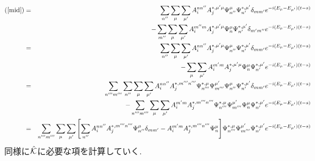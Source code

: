 \documentclass[10.5pt,a4paper]{jreport}
\newcommand{\calK}{{\cal K}}
\begin{document}
\begin{eqnarray}
  \nonumber(\ref{mid}) &=&\sum_{n''}\sum_{\mu}\sum_{\mu'}A_i^{nn''}A_j^{*, \mu'\mu}\Psi_{n''}^{\mu}\Psi_{n'}^{*, \mu'}\delta_{mm'}e^{-i(E_\mu - E_{\mu'})(t-s)}\\
  &&- \sum_{m''}\sum_{\mu}\sum_{\mu'}A_i^{m''m}A_j^{*, \mu'\mu}\Psi_{n}^{\mu}\Psi_{n'}^{*, \mu'}\delta_{m'm''}e^{-i(E_\mu - E_{\mu'})(t-s)}\\
  \nonumber &=&\sum_{n''}\sum_{\mu}\sum_{\mu'}A_i^{nn''}A_j^{*, \mu'\mu}\Psi_{n''}^{\mu}\Psi_{n'}^{*, \mu'}\delta_{mm'}e^{-i(E_\mu - E_{\mu'})(t-s)}\\
  &&- \sum_{\mu}\sum_{\mu'}A_i^{m'm}A_j^{*, \mu'\mu}\Psi_{n}^{\mu}\Psi_{n'}^{*, \mu'}e^{-i(E_\mu - E_{\mu'})(t-s)}\\
  \nonumber &=&\sum_{n'''m'''}\sum_{n''}\sum_{\mu}\sum_{\mu'}A_i^{nn''}A_j^{*, m'''n'''}\Psi_{n'''}^{*, \mu}\Psi_{m'''}^{\mu'}\Psi_{n''}^{\mu}\Psi_{n'}^{*, \mu'}\delta_{mm'}e^{-i(E_\mu - E_{\mu'})(t-s)}\\
  &&- \sum_{n'''m'''}\sum_{\mu}\sum_{\mu'}A_i^{m'm}A_j^{*, m'''n'''}\Psi_{n'''}^{*, \mu}\Psi_{m'''}^{\mu'}\Psi_{n}^{\mu}\Psi_{n'}^{*, \mu'}e^{-i(E_\mu - E_{\mu'})(t-s)}\\
  \nonumber &=&\sum_{n'''m'''}\sum_{\mu}\sum_{\mu'}\bqty{\sum_{n''}A_i^{nn''}A_j^{*, m'''n'''}\Psi_{n''}^{\mu}\delta_{mm'}- A_i^{m'm}A_j^{*, m'''n'''}\Psi_{n}^{\mu}}\Psi_{n'''}^{*, \mu}\Psi_{m'''}^{\mu'}\Psi_{n'}^{*, \mu'}e^{-i(E_\mu - E_{\mu'})(t-s)}\label{end1}\\
\end{eqnarray}
同様に$\hat{\calK}$に必要な項を計算していく.

\end{document}
